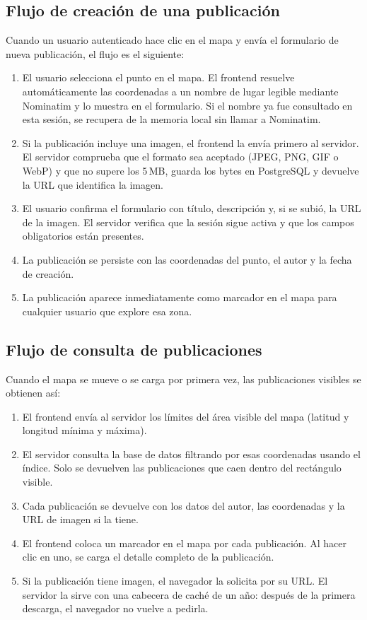 \subsection*{Flujo de creación de una publicación}

Cuando un usuario autenticado hace clic en el mapa y envía el formulario de nueva publicación, el flujo es el siguiente:

\begin{enumerate}
    \item El usuario selecciona el punto en el mapa. El frontend resuelve automáticamente las coordenadas a un nombre de lugar legible mediante Nominatim y lo muestra en el formulario. Si el nombre ya fue consultado en esta sesión, se recupera de la memoria local sin llamar a Nominatim.
    \item Si la publicación incluye una imagen, el frontend la envía primero al servidor. El servidor comprueba que el formato sea aceptado (JPEG, PNG, GIF o WebP) y que no supere los 5\,MB, guarda los bytes en PostgreSQL y devuelve la URL que identifica la imagen.
    \item El usuario confirma el formulario con título, descripción y, si se subió, la URL de la imagen. El servidor verifica que la sesión sigue activa y que los campos obligatorios están presentes.
    \item La publicación se persiste con las coordenadas del punto, el autor y la fecha de creación.
    \item La publicación aparece inmediatamente como marcador en el mapa para cualquier usuario que explore esa zona.
\end{enumerate}

\subsection*{Flujo de consulta de publicaciones}

Cuando el mapa se mueve o se carga por primera vez, las publicaciones visibles se obtienen así:

\begin{enumerate}
    \item El frontend envía al servidor los límites del área visible del mapa (latitud y longitud mínima y máxima).
    \item El servidor consulta la base de datos filtrando por esas coordenadas usando el índice. Solo se devuelven las publicaciones que caen dentro del rectángulo visible.
    \item Cada publicación se devuelve con los datos del autor, las coordenadas y la URL de imagen si la tiene.
    \item El frontend coloca un marcador en el mapa por cada publicación. Al hacer clic en uno, se carga el detalle completo de la publicación.
    \item Si la publicación tiene imagen, el navegador la solicita por su URL. El servidor la sirve con una cabecera de caché de un año: después de la primera descarga, el navegador no vuelve a pedirla.
\end{enumerate}

